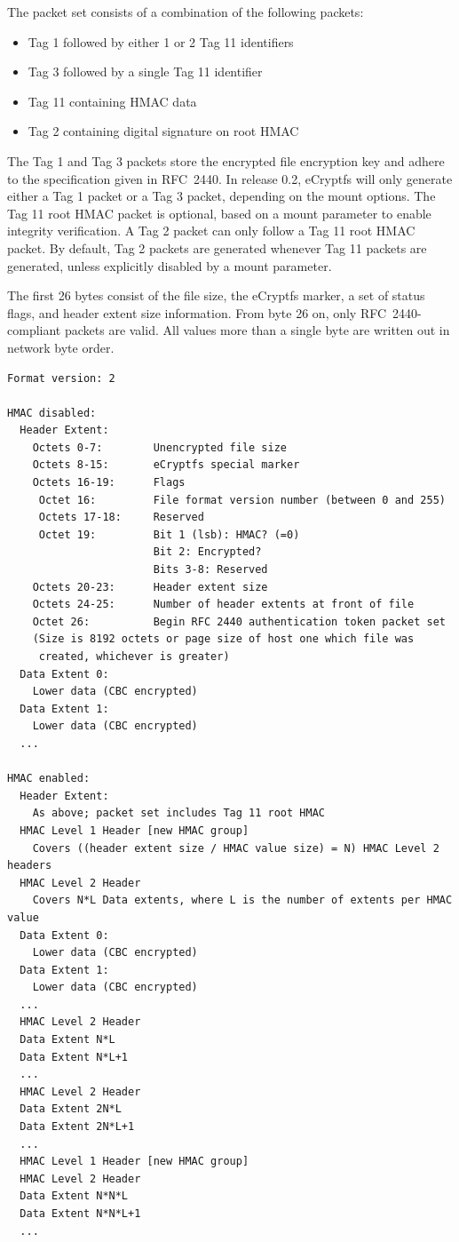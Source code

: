 \documentclass{article}
\begin{document}
\label{file_format}

The packet set consists of a combination of the following packets:

\begin{itemize}
\item{Tag 1 followed by either 1 or 2 Tag 11 identifiers}
\item{Tag 3 followed by a single Tag 11 identifier}
\item{Tag 11 containing HMAC data}
\item{Tag 2 containing digital signature on root HMAC}
\end{itemize}

The Tag 1 and Tag 3 packets store the encrypted file encryption key
and adhere to the specification given in RFC~2440. In release 0.2,
eCryptfs will only generate either a Tag 1 packet or a Tag 3 packet,
depending on the mount options. The Tag 11 root HMAC packet is
optional, based on a mount parameter to enable integrity
verification. A Tag 2 packet can only follow a Tag 11 root HMAC
packet. By default, Tag 2 packets are generated whenever Tag 11
packets are generated, unless explicitly disabled by a mount
parameter.

The first 26 bytes consist of the file size, the eCryptfs marker, a
set of status flags, and header extent size information. From byte 26
on, only RFC~2440-compliant packets are valid. All values more than
a single byte are written out in network byte order.

\scriptsize
\begin{verbatim}
Format version: 2

HMAC disabled:
  Header Extent:
    Octets 0-7:        Unencrypted file size
    Octets 8-15:       eCryptfs special marker
    Octets 16-19:      Flags
     Octet 16:         File format version number (between 0 and 255)
     Octets 17-18:     Reserved
     Octet 19:         Bit 1 (lsb): HMAC? (=0)
                       Bit 2: Encrypted?
                       Bits 3-8: Reserved
    Octets 20-23:      Header extent size
    Octets 24-25:      Number of header extents at front of file
    Octet 26:          Begin RFC 2440 authentication token packet set
    (Size is 8192 octets or page size of host one which file was
     created, whichever is greater)
  Data Extent 0:
    Lower data (CBC encrypted)
  Data Extent 1:
    Lower data (CBC encrypted)
  ...

HMAC enabled:
  Header Extent:
    As above; packet set includes Tag 11 root HMAC
  HMAC Level 1 Header [new HMAC group]
    Covers ((header extent size / HMAC value size) = N) HMAC Level 2 headers
  HMAC Level 2 Header
    Covers N*L Data extents, where L is the number of extents per HMAC value
  Data Extent 0:
    Lower data (CBC encrypted)
  Data Extent 1:
    Lower data (CBC encrypted)
  ...
  HMAC Level 2 Header
  Data Extent N*L
  Data Extent N*L+1
  ...
  HMAC Level 2 Header
  Data Extent 2N*L
  Data Extent 2N*L+1
  ...
  HMAC Level 1 Header [new HMAC group]
  HMAC Level 2 Header
  Data Extent N*N*L
  Data Extent N*N*L+1
  ...
\end{verbatim}
\normalsize
\end{document}
